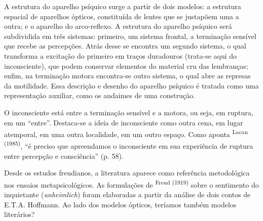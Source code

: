 \begin{multicols}{2}
{{}
}
\par
\par{}A estrutura do aparelho psíquico surge a partir de dois modelos:\allowbreak{} a estrutura espacial de aparelhos ópticos,\allowbreak{} constituída de lentes que se justapõem uma a outra; e o aparelho do arco-\allowbreak{}reflexo.\allowbreak{} A estrutura do aparelho psíquico será subdividida em três sistemas:\allowbreak{} primeiro,\allowbreak{} um sistema frontal,\allowbreak{} a terminação sensível que recebe as percepções.\allowbreak{} Atrás desse se encontra um segundo sistema,\allowbreak{} o qual transforma a excitação do primeiro em traços duradouros (\allowbreak{}trata-\allowbreak{}se aqui do inconsciente)\allowbreak{},\allowbreak{} que podem conservar elementos do material cru das lembranças; enfim,\allowbreak{} na terminação motora encontra-\allowbreak{}se outro sistema,\allowbreak{} o qual abre as represas da motilidade.\allowbreak{} Essa descrição e desenho do aparelho psíquico é tratada como uma representação auxiliar,\allowbreak{} como os andaimes de uma construção.\allowbreak{}\par{}O inconsciente está entre a terminação sensível e a motora,\allowbreak{} ou seja,\allowbreak{} em ruptura,\allowbreak{} em um “entre”.\allowbreak{} Destaca-\allowbreak{}se a ideia de inconsciente como outra cena,\allowbreak{} em lugar atemporal,\allowbreak{} em uma outra localidade,\allowbreak{} em um outro espaço.\allowbreak{} Como aponta \textsuperscript{Lacan (\allowbreak{}1985)\allowbreak{}},\allowbreak{} “é preciso que apreendamos o inconsciente em sua experiência de ruptura entre percepção e consciência” (\allowbreak{}p.\allowbreak{} 58)\allowbreak{}.\allowbreak{}\par{}Desde os estudos freudianos,\allowbreak{} a literatura aparece como referência metodológica nos ensaios metapsicológicos.\allowbreak{} As formulações de \textsuperscript{Freud (\allowbreak{}1919)\allowbreak{}} sobre o sentimento do inquietante (\allowbreak{}\textit{unheimlich})\allowbreak{} foram elaboradas a partir da análise de dois contos de E.\allowbreak{}T.\allowbreak{}A.\allowbreak{} Hoffmann.\allowbreak{} Ao lado dos modelos ópticos,\allowbreak{} teríamos também modelos literários?

\end{multicols}
